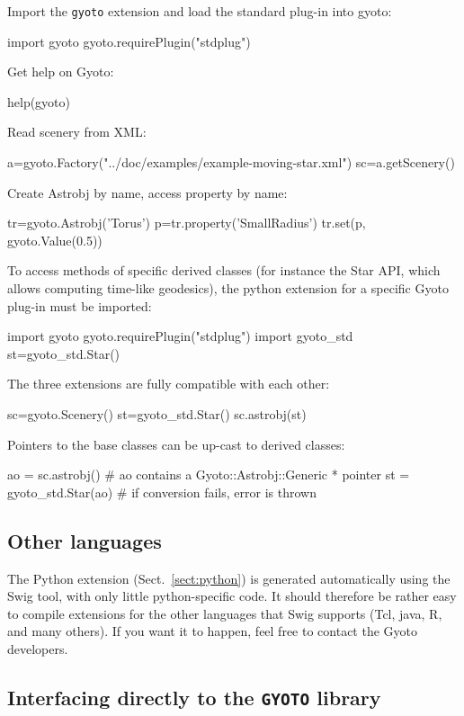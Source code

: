 \documentclass[a4paper,12pt]{article}
\begin{document}
Import the \texttt{gyoto} extension and load the standard plug-in into
gyoto:
\begin{code}
  import gyoto
  gyoto.requirePlugin("stdplug")
\end{code}
Get help on Gyoto:
\begin{code}
  help(gyoto)
\end{code}
Read scenery from XML:
\begin{code}
  a=gyoto.Factory("../doc/examples/example-moving-star.xml")
  sc=a.getScenery()
\end{code}
Create Astrobj by name, access property by name:
\begin{code}
  tr=gyoto.Astrobj('Torus')
  p=tr.property('SmallRadius')
  tr.set(p, gyoto.Value(0.5))
\end{code}

To access methods of specific derived classes (for instance the Star
API, which allows computing time-like geodesics), the python extension
for a specific Gyoto plug-in must be imported:
\begin{code}
  import gyoto
  gyoto.requirePlugin("stdplug")
  import gyoto_std
  st=gyoto_std.Star()
\end{code}
The three extensions are fully compatible with each other:
\begin{code}
  sc=gyoto.Scenery()
  st=gyoto_std.Star()
  sc.astrobj(st)
\end{code}
Pointers to the base classes can be up-cast to derived classes:
\begin{code}
  ao = sc.astrobj() # ao contains a Gyoto::Astrobj::Generic * pointer
  st = gyoto_std.Star(ao) # if conversion fails, error is thrown
\end{code}


\subsection{Other languages}
\label{sect:swig}

The Python extension (Sect.~\ref{sect:python}) is generated
automatically using the Swig tool, with only little python-specific
code. It should therefore be rather easy to compile extensions for the
other languages that Swig supports (Tcl, java, R, and many others). If
you want it to happen, feel free to contact the Gyoto developers.

\subsection{Interfacing directly to the \texttt{GYOTO} library}
\end{document}
